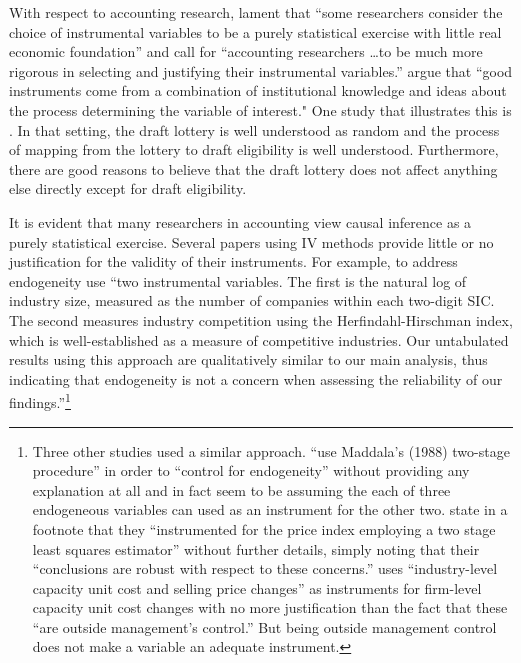 \documentclass[11pt,reqno,titlepage]{amsart}
\begin{document}
\begin{doublespace}
With respect to accounting research, \citet{Larcker:2010fq} lament that ``some researchers consider the choice of instrumental variables to be a purely statistical exercise with little real economic foundation'' and call for 
``accounting researchers \dots to be much more rigorous in selecting and justifying their instrumental variables.'' 
\citet[p.117]{Angrist:2008vk} argue that ``good instruments come from a combination of institutional knowledge and ideas about the process determining the variable of interest."
One study that illustrates this is \citet{Angrist:1990dk}.
In that setting, the draft lottery is well understood as random and the process of mapping from the lottery to draft eligibility is well understood.
Furthermore, there are good reasons to believe that the draft lottery does not affect anything else directly except for draft eligibility.%

It is evident that many researchers in accounting view causal inference as a purely statistical exercise.
Several papers using IV methods  provide little or no justification for the validity of their instruments.
For example, to address endogeneity \citet{Cohen:2014jl} use ``two instrumental variables. The first is the natural log of industry size, measured as the number of companies within each two-digit SIC. The second measures industry competition using the Herfindahl-Hirschman index, which is well-established as a measure of competitive industries. Our untabulated results using this approach are qualitatively similar to our main analysis, thus indicating that endogeneity is not a concern when assessing the reliability of our findings.''\footnote{
Three other studies used a similar approach.
 \citet{Vermeer:2014bs} ``use Maddala's (1988) two-stage procedure'' in order to ``control for endogeneity'' without providing any explanation at all and in fact seem to be assuming the each of three endogeneous variables can used as an instrument for the other two.
\citet[p.48]{Fox:2014io} state in a footnote that they ``instrumented for the price index employing a two stage least squares estimator'' without further details, simply noting that their ``conclusions are robust with respect to these concerns.''
\citet{Cannon:2014im} uses ``industry-level capacity unit cost and selling price changes'' as instruments for firm-level capacity unit cost changes with no more justification than the fact that these ``are outside management's control.'' But being outside management control does not make a variable an adequate instrument.}


\end{doublespace}
\end{document}
